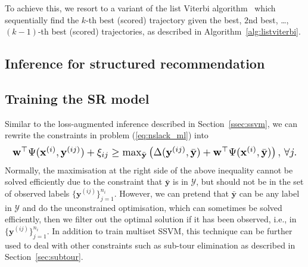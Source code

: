 To achieve this, we resort to a variant of the list Viterbi algorithm~\cite{nilsson2001sequentially,seshadri1994list}
which sequentially find the $k$-th best (scored) trajectory given the best, $2$nd best, \dots, $(k-1)$-th best (scored) trajectories,
as described in Algorithm~\ref{alg:listviterbi}.


\subsection{Inference for structured recommendation}
\label{ssec:SRinf}



\subsection{Training the SR model}
\label{ssec:SRtrain}


Similar to the loss-augmented inference described in Section~\ref{ssec:ssvm}, 
we can rewrite the constraints in problem (\ref{eq:nslack_ml}) into
\begin{equation*}
\resizebox{0.99\linewidth}{!}
{$
\mathbf{w}^\top \Psi(\mathbf{x}^{(i)}, \mathbf{y}^{(ij)}) + \xi_{ij} \ge 
\max_{\bar{\mathbf{y}}} \left( \Delta(\mathbf{y}^{(ij)}, \bar{\mathbf{y}}) + \mathbf{w}^\top \Psi(\mathbf{x}^{(i)}, \bar{\mathbf{y}}) \right),
\, \forall j.
$}
\end{equation*} 
Normally, the maximisation at the right side of the above inequality cannot be solved efficiently due to the constraint that 
$\bar{\mathbf{y}}$ is in $\mathcal{Y}$,
but should not be in the set of observed labels $\{\mathbf{y}^{(ij)}\}_{j=1}^{n_i}$.
However, we can pretend that $\bar{\mathbf{y}}$ can be any label in $\mathcal{Y}$ and do the unconstrained optimisation,
which can sometimes be solved efficiently, then we filter out the optimal solution if it has been observed, 
i.e., in $\{\mathbf{y}^{(ij)}\}_{j=1}^{n_i}$. 
In addition to train multiset SSVM, this technique can be further used to deal with other constraints such as sub-tour elimination 
as described in Section~\ref{sec:subtour}.






